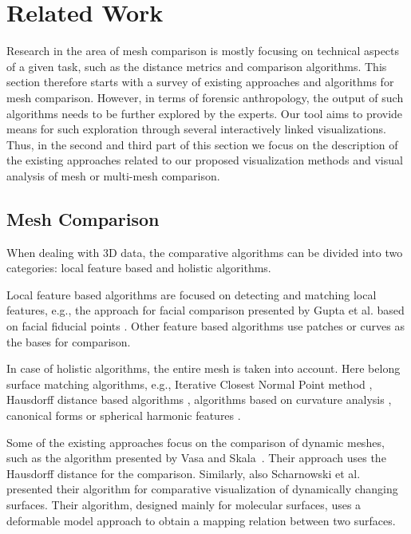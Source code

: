 \documentclass[final,5p,times]{elsarticle}
\begin{document}

\section{Related Work} \label{related}
Research in the area of mesh comparison is mostly focusing on technical aspects of a given task, such as the distance metrics and comparison algorithms.
This section therefore starts with a survey of existing approaches and algorithms for mesh comparison.
However, in terms of forensic anthropology, the output of such algorithms needs to be further explored by the experts.
Our tool aims to provide means for such exploration through several interactively linked visualizations.
Thus, in the second and third part of this section we focus on the description of the existing approaches related to our proposed visualization methods and visual analysis of mesh or multi-mesh comparison.

\subsection{Mesh Comparison}
When dealing with 3D data, the comparative algorithms can be divided into two categories: local feature based and holistic algorithms.

Local feature based algorithms are focused on detecting and matching local features, e.g., the approach for facial comparison presented by Gupta et al. based on facial fiducial points \cite{gupta2010anthropometric}. 
Other feature based algorithms use patches \cite{guo2016ei3d,chua20003d} or curves \cite{bronstein2005three} as the bases for comparison. 

In case of holistic algorithms, the entire mesh is taken into account.
Here belong surface matching algorithms, e.g., Iterative Closest Normal Point method \cite{mohammadzade2013iterative}, Hausdorff distance based algorithms \cite{huttenlocher1993comparing,pan2003automatic}, algorithms based on curvature analysis \cite{lei20093d,tanaka1998curvature}, canonical forms \cite{bronstein2007expression} or spherical harmonic features \cite{liu2013learning}.

Some of the existing approaches focus on the comparison of dynamic meshes, such as the algorithm presented by Vasa and Skala~\cite{Vasa2006}.
Their approach uses the Hausdorff distance for the comparison.
Similarly, also Scharnowski et al.~\cite{Scharnowski2014} presented their algorithm for comparative visualization of dynamically changing surfaces.
Their algorithm, designed mainly for molecular surfaces, uses a deformable model approach to obtain a mapping relation between two surfaces.
\end{document}
